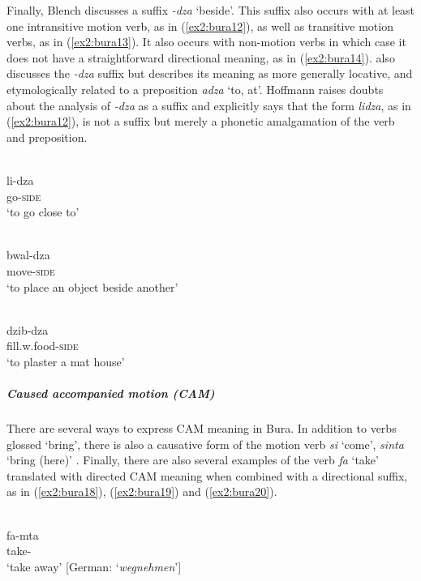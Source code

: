 Finally, Blench discusses a suffix \textit{-dza} `beside'. This suffix also occurs with at least one intransitive motion verb, as in (\ref{ex2:bura12}), as well as transitive motion verbs, as in (\ref{ex2:bura13}). It also occurs with non-motion verbs in which case it does not have a straightforward directional meaning, as in (\ref{ex2:bura14}). \citet[275]{hoffmannUntersuchungenZurStruktur1955} also discusses the \textit{-dza} suffix but describes its meaning as more generally locative, and etymologically related to a preposition \textit{adza} `to, at'. Hoffmann raises doubts about the analysis of \textit{-dza} as a suffix and explicitly says that the form \textit{lidza}, as in (\ref{ex2:bura12}), is not a suffix but merely a phonetic amalgamation of the verb and preposition. 

\ea\label{ex2:bura12}
 \\
\gll li-dza \\
go-\textsc{side} \\
\glt `to go close to'

\ex\label{ex2:bura13}
 \\
\gll bwal-dza \\
move-\textsc{side} \\
\glt `to place an object beside another'

\ex\label{ex2:bura14}
 \\
\gll dzib-dza \\
fill.w.food-\textsc{side} \\
\glt `to plaster a mat house'
\z 

\subparagraph{Caused accompanied motion (CAM)}

There are several ways to express CAM meaning in Bura. In addition to verbs glossed `bring', there is also a causative form of the motion verb \textit{si} `come', \textit{sinta} `bring (here)' \citep[294]{hoffmannUntersuchungenZurStruktur1955}. Finally, there are also several examples of the verb \textit{fa} `take' translated with directed CAM meaning when combined with a directional suffix, as in (\ref{ex2:bura18}), (\ref{ex2:bura19}) and (\ref{ex2:bura20}).

\ea\label{ex2:bura18}
 \\
\gll fa-mta \\
take- \\
\glt `take away' [German: `\textit{wegnehmen}']

